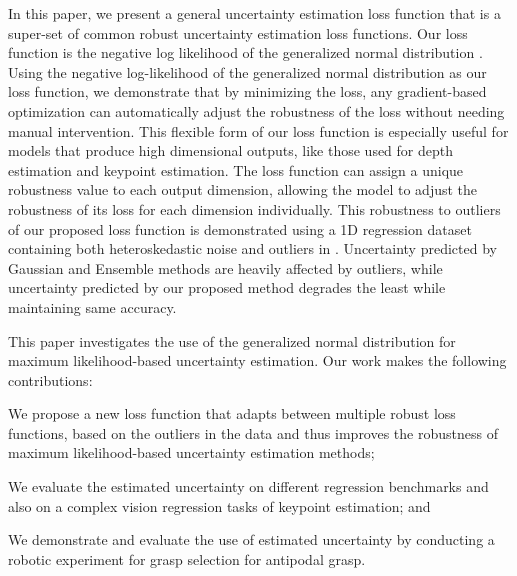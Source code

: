 \documentclass[letterpaper, 10 pt, conference]{ieeeconf}  %
\begin{document}
In this paper, we present a general uncertainty estimation loss function that is a super-set of common robust uncertainty estimation loss functions.
Our loss function is the negative log likelihood of the generalized normal distribution \cite{nadarajah2005generalized} . 
Using the negative log-likelihood of the generalized normal distribution as our loss function, we demonstrate that by minimizing the loss, any gradient-based optimization can automatically adjust the robustness of the loss without needing manual intervention.
This flexible form of our loss function is especially useful for models that produce high dimensional outputs, like those used for depth estimation and keypoint estimation. The loss function can assign a unique robustness value to each output dimension, allowing the model to adjust the robustness of its loss for each dimension individually. This robustness to outliers of our proposed loss function is demonstrated using a 1D regression dataset containing both heteroskedastic noise and outliers in . Uncertainty predicted by Gaussian and Ensemble methods are heavily affected by outliers, while uncertainty predicted by our proposed method degrades the least while maintaining same accuracy.

This paper investigates the use of the generalized normal distribution \cite{nadarajah2005generalized} for maximum likelihood-based uncertainty estimation. Our work makes the following contributions:
\begin{compactenum}
	\item We propose a new loss function that adapts between multiple robust loss functions, based on the outliers in the data and thus improves the robustness of maximum likelihood-based uncertainty estimation methods;\par
	\item We evaluate the estimated uncertainty on different regression benchmarks and also on a complex vision regression tasks of keypoint estimation; and\par
	\item We demonstrate and evaluate the use of estimated uncertainty by conducting a robotic experiment for grasp selection for antipodal grasp.\par
\end{compactenum}
\end{document}
